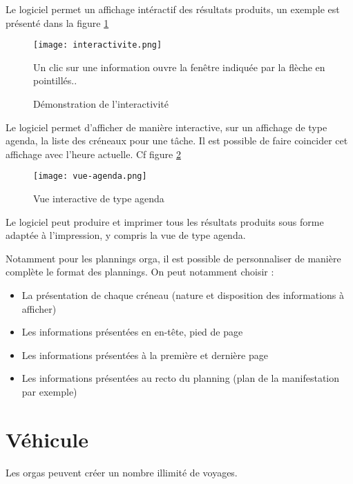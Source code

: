 Le logiciel permet un affichage intéractif des résultats produits, un exemple est présenté dans la figure \ref{fig:interactivite}

\begin{figure}[h!t]
\centering
\texttt{[image: interactivite.png]}

Un clic sur une information ouvre la fenêtre indiquée par la flèche en pointillés..
\caption{Démonstration de l'interactivité}
\label{fig:interactivite}
\end{figure}


Le logiciel permet d'afficher de manière interactive, sur un affichage de type agenda, la liste des créneaux pour une tâche. Il est possible de faire coincider cet affichage avec l'heure actuelle.
Cf figure \ref{fig:agenda}

\begin{figure}[h!t]
\centering
\texttt{[image: vue-agenda.png]}

\caption{Vue interactive de type agenda}
\label{fig:agenda}
\end{figure}


Le logiciel peut produire et imprimer tous les résultats produits sous forme adaptée à l'impression, y compris la vue de type agenda.


Notamment pour les plannings orga, il est possible de personnaliser de manière complète le format des plannings. On peut notamment choisir :
\begin{itemize}
 \item La présentation de chaque créneau (nature et disposition des informations à afficher)
\item Les informations présentées en en-tête, pied de page
\item Les informations présentées à la première et dernière page
\item Les informations présentées au recto du planning (plan de la manifestation par exemple)
\end{itemize}

\section{Véhicule}

Les orgas peuvent créer un nombre illimité de voyages.



